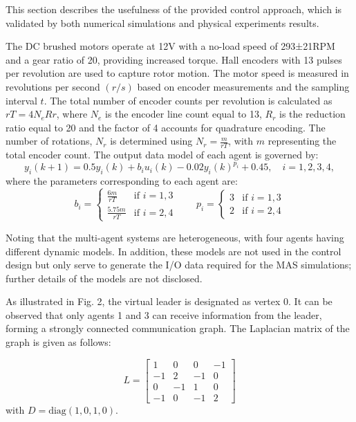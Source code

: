 \documentclass[journal,onecolumn]{IEEEtran}
\begin{document}

This section describes the usefulness of the provided control approach, which is validated by both numerical simulations and physical experiments results.

The DC brushed motors operate at 12V with a no-load speed of 293±21RPM and a gear ratio of 20, providing increased torque. Hall encoders with 13 pulses per revolution are used to capture rotor motion. The motor speed is measured in revolutions per second $(r/s)$ based on encoder measurements and the sampling interval $t$. The total number of encoder counts per revolution is calculated as $ rT=4N_{e}R{r} $, where $N_e$ is the encoder line count equal to 13, $R_r$ is the reduction ratio equal to 20 and the factor of 4 accounts for quadrature encoding. The number of rotations, $N_r$ is determined using $N_r = \frac{m}{rT}$, with $m$ representing the total encoder count. The output data model of each agent is governed by:
\[
    y_i(k+1) = 0.5 y_i(k) + b_i u_i(k) - 0.02 y_i(k)^{p_i} + 0.45, \quad i = 1, 2, 3, 4,
\]
where the parameters corresponding to each agent are:
\[
b_i = \begin{cases} 
    \frac{6m}{rT} & \text{if } i=1, 3 \\
    \frac{5.75m}{rT} & \text{if } i=2, 4
\end{cases}
\qquad
p_i = \begin{cases} 
3 & \text{if } i=1, 3 \\
2 & \text{if } i=2, 4
\end{cases}
\]

Noting that the multi-agent systems are heterogeneous, with four agents having different dynamic models. In addition, these models are not used in the control design but only serve to generate the I/O data required for the MAS simulations; further details of the models are not disclosed. 

As illustrated in Fig. 2, the virtual leader is designated as vertex 0. It can be observed that only agents 1 and 3 can receive information from the leader, forming a strongly connected communication graph. The Laplacian matrix of the graph is given as follows:

\[
    L = \begin{bmatrix}
    1 & 0 & 0 & -1 \\
    -1 & 2 & -1 & 0 \\
    0 & -1 & 1 & 0 \\
    -1 & 0 & -1 & 2
    \end{bmatrix}
\]
with \( D = \text{diag}(1, 0, 1, 0) \).
\end{document}
